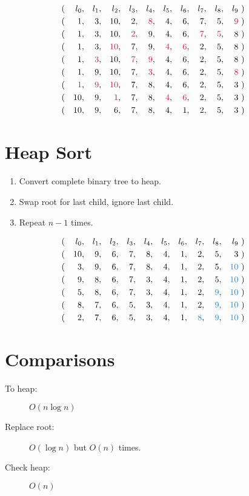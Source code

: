 \documentclass{notes}
\begin{document}
  \begin{align*}
  &(&l_0&,&l_1&,&l_2&,&l_3&,&l_4&,&l_5&,&l_6&,&l_7&,&l_8&,&l_9\ &)&\\
  &(&1&,&3&,&10&,&2&,&{\color{gmitred}8}&,&4&,&6&,&7&,&5&,&{\color{gmitred}9}\ &)&\\
  &(&1&,&3&,&10&,&{\color{gmitred}2}&,&9&,&4&,&6&,&{\color{gmitred}7}&,&{\color{gmitred}5}&,&8\ &)&\\
  &(&1&,&3&,&{\color{gmitred}10}&,&7&,&9&,&{\color{gmitred}4}&,&{\color{gmitred}6}&,&2&,&5&,&8\ &)&\\
  &(&1&,&{\color{gmitred}3}&,&10&,&{\color{gmitred}7}&,&{\color{gmitred}9}&,&4&,&6&,&2&,&5&,&8\ &)&\\
  &(&1&,&9&,&10&,&7&,&{\color{gmitred}3}&,&4&,&6&,&2&,&5&,&{\color{gmitred}8}\ &)&\\
  &(&{\color{gmitred}1}&,&{\color{gmitred}9}&,&{\color{gmitred}10}&,&7&,&8&,&4&,&6&,&2&,&5&,&3\ &)&\\
  &(&10&,&9&,&{\color{gmitred}1}&,&7&,&8&,&{\color{gmitred}4}&,&{\color{gmitred}6}&,&2&,&5&,&3\ &)&\\
  &(&10&,&9&,&6&,&7&,&8&,&4&,&1&,&2&,&5&,&3\ &)&\\
  \end{align*}
  
  \section*{Heap Sort}
    \begin{enumerate}
      \item Convert complete binary tree to heap.
      \item Swap root for last child, ignore last child.
      \item Repeat \(n-1\) times.
    \end{enumerate}

    \begin{align*}
      &(&l_0&,&l_1&,&l_2&,&l_3&,&l_4&,&l_5&,&l_6&,&l_7&,&l_8&,&l_9\ &)&\\
      &(&10&,&9&,&6&,&7&,&8&,&4&,&1&,&2&,&5&,&3\ &)&\\
      &(&3&,&9&,&6&,&7&,&8&,&4&,&1&,&2&,&5&,&{\color{gmitblue}10}\ &)&\\
      &(&9&,&8&,&6&,&7&,&3&,&4&,&1&,&2&,&5&,&{\color{gmitblue}10}\ &)&\\
      &(&5&,&8&,&6&,&7&,&3&,&4&,&1&,&2&,&{\color{gmitblue}9}&,&{\color{gmitblue}10}\ &)&\\
      &(&8&,&7&,&6&,&5&,&3&,&4&,&1&,&2&,&{\color{gmitblue}9}&,&{\color{gmitblue}10}\ &)&\\
      &(&2&,&7&,&6&,&5&,&3&,&4&,&1&,&{\color{gmitblue}8}&,&{\color{gmitblue}9}&,&{\color{gmitblue}10}\ &)&\\
    \end{align*}

  \section*{Comparisons}

    \begin{description}
      \item[To heap:] \(O(n \log n)\)
      \item[Replace root:] \(O(\log n)\) but \( O(n) \) times.
      \item[Check heap:] \(O(n)\) 
    \end{description}

\end{document}
